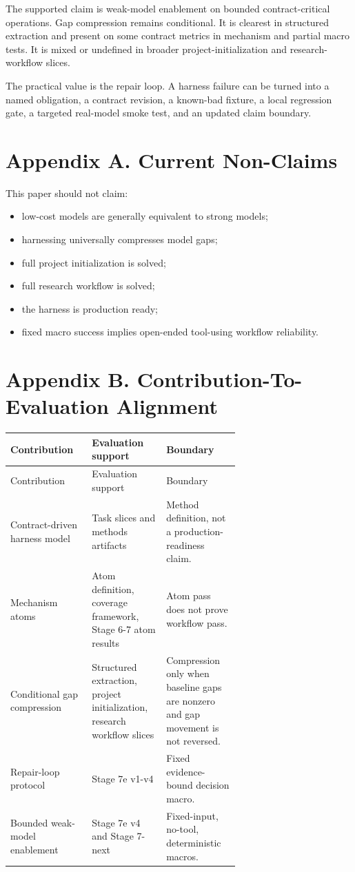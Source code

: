 \documentclass[11pt]{article}
\begin{document}
The supported claim is weak-model enablement on bounded contract-critical operations. Gap compression remains conditional. It is clearest in structured extraction and present on some contract metrics in mechanism and partial macro tests. It is mixed or undefined in broader project-initialization and research-workflow slices.

The practical value is the repair loop. A harness failure can be turned into a named obligation, a contract revision, a known-bad fixture, a local regression gate, a targeted real-model smoke test, and an updated claim boundary.

\section{Appendix A. Current Non-Claims}

This paper should not claim:

\begin{itemize}
\item low-cost models are generally equivalent to strong models;
\item harnessing universally compresses model gaps;
\item full project initialization is solved;
\item full research workflow is solved;
\item the harness is production ready;
\item fixed macro success implies open-ended tool-using workflow reliability.
\end{itemize}

\section{Appendix B. Contribution-To-Evaluation Alignment}

{\small
\setlength{\tabcolsep}{3pt}
\begin{longtable}{>{\raggedright\arraybackslash}p{0.220\linewidth}>{\raggedright\arraybackslash}p{0.220\linewidth}>{\raggedright\arraybackslash}p{0.220\linewidth}}
\toprule
Contribution & Evaluation support & Boundary \\
\midrule
\endfirsthead
\toprule
Contribution & Evaluation support & Boundary \\
\midrule
\endhead
Contract-driven harness model & Task slices and methods artifacts & Method definition, not a production-readiness claim. \\
Mechanism atoms & Atom definition, coverage framework, Stage 6-7 atom results & Atom pass does not prove workflow pass. \\
Conditional gap compression & Structured extraction, project initialization, research workflow slices & Compression only when baseline gaps are nonzero and gap movement is not reversed. \\
Repair-loop protocol & Stage 7e v1-v4 & Fixed evidence-bound decision macro. \\
Bounded weak-model enablement & Stage 7e v4 and Stage 7-next & Fixed-input, no-tool, deterministic macros. \\
\bottomrule
\end{longtable}
}
\end{document}
